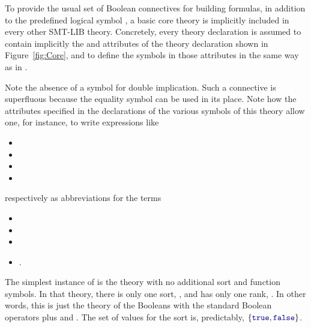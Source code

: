 To provide the usual set of Boolean connectives for building formulas,
in addition to the predefined logical symbol ,
a basic core theory is implicitly included in every other SMT-LIB theory.
Concretely, every theory declaration is assumed to contain implicitly
the  and  attributes of the  theory declaration
shown in Figure~\ref{fig:Core},
and to define the symbols in those attributes in the same way as in .

Note the absence of a symbol for double implication.
Such a connective is superfluous 
because the equality symbol \ter{=} can be used in its place. 
Note how the attributes specified in the declarations of the various symbols
of this theory allow one, for instance, to write expressions like 

\begin{itemize} \setlength\itemsep{0ex}
\item[] 
\item[] 
\item[] 
\item[] 
\end{itemize}

\noindent respectively as abbreviations for the terms

\begin{itemize} \setlength\itemsep{0ex}
\item[] 
\item[] 
\item[] 
\item[]  .
\end{itemize}

The simplest instance of  is the theory with no additional sort
and function symbols.
In that theory, there is only one sort, ,
and  has only one rank, .
In other words, this is just the theory of the Booleans with the standard Boolean operators
plus  and .
The set of values for the  sort is, predictably, $\{\ter{true},\ter{false}\}$.

